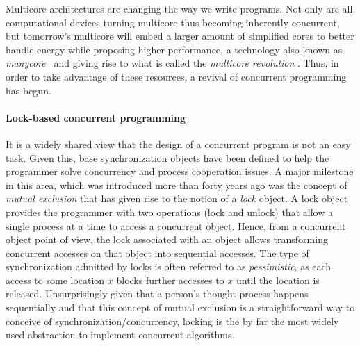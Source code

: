 Multicore architectures are changing the way we write programs.
Not only are all computational devices
turning multicore thus becoming inherently concurrent, 
but tomorrow's multicore will embed a larger amount of simplified cores to better handle energy while 
proposing higher performance, a technology also known as \emph{manycore}~\cite{Borkar2007}
and giving rise to what is called the {\it multicore  
revolution} \cite{HL08}.
Thus, in order to take advantage of these resources, a revival of concurrent programming has begun.


\paragraph{Lock-based concurrent programming}
%
It is a widely shared view  that the design of a concurrent program is not an easy
task.
Given this, base synchronization objects have been defined to help 
the programmer solve  concurrency and process cooperation  issues. 
A  major milestone in this area, which was introduced 
more than forty years  ago was the concept of {\it mutual exclusion} \cite{D68}
that has given rise  to  the  notion of  a  {\it  lock} object.    
A lock object provides the programmer with two operations (lock and unlock)
that  allow a single process at a time to access a concurrent object. 
Hence, from a  concurrent object point of view,   the  lock associated with
an object allows transforming  concurrent  accesses on  that object  
into sequential accesses.
The type of synchronization admitted by locks is often referred to as \emph{pessimistic}, 
as each access to some location $x$ blocks further accesses to $x$ until the location is released.
Unsurprisingly given that
a person's thought process happens sequentially
and that this concept of mutual exclusion is a straightforward way to
conceive of synchronization/concurrency,
locking is the by far the most widely used abstraction to
implement concurrent algorithms.

